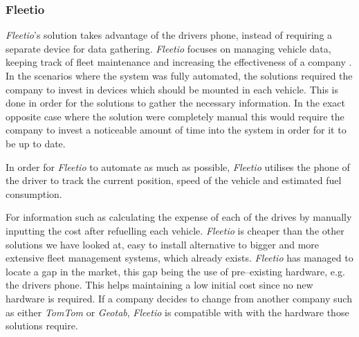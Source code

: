 \subsubsection{Fleetio}
\textit{Fleetio}'s solution takes advantage of the drivers phone, instead of requiring a separate device for data gathering.
\textit{Fleetio} focuses on managing vehicle data, keeping track of fleet maintenance and increasing the effectiveness of a company \cite{fleetio}.
In the scenarios where the system was fully automated, the solutions required the company to invest in devices which should be mounted in each vehicle.
This is done in order for the solutions to gather the necessary information.
In the exact opposite case where the solution were completely manual this would require the company to invest a noticeable amount of time into the system in order for it to be up to date.

In order for \textit{Fleetio} to automate as much as possible, \textit{Fleetio} utilises the phone of the driver to track the current position, speed of the vehicle and estimated fuel consumption.

For information such as calculating the expense of each of the drives by manually inputting the cost after refuelling each vehicle.
\textit{Fleetio} is cheaper than the other solutions we have looked at, easy to install alternative to bigger and more extensive fleet management systems, which already exists.
\textit{Fleetio} has managed to locate a gap in the market, this gap being the use of pre--existing hardware, e.g. the drivers phone.
This helps maintaining a low initial cost since no new hardware is required.
If a company decides to change from another company such as either \textit{TomTom} or \textit{Geotab}, \textit{Fleetio} is compatible with with the hardware those solutions require.
